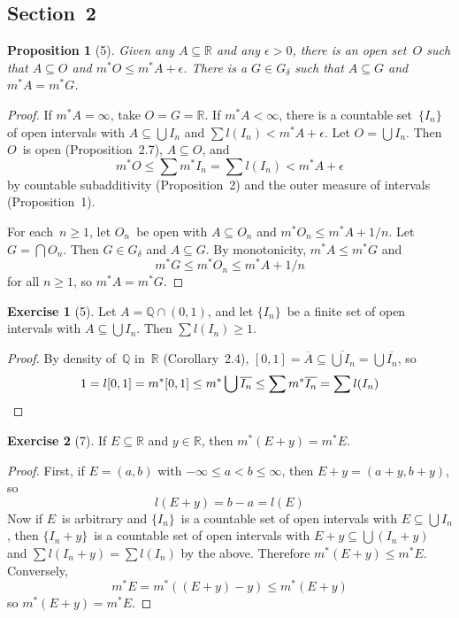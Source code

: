 \documentclass[letterpaper,12pt]{article}
\newcommand{\Q}{\mathbb{Q}}
\newcommand{\R}{\mathbb{R}}
\newcommand{\Gd}{G_{\delta}}
\newcommand{\sect}{\cap}
\newcommand{\bigunion}{\bigcup}
\newcommand{\bigsect}{\bigcap}
\newcommand{\len}{l}
\newcommand{\mo}{m^*}
\newcommand{\closure}[1]{\overline{#1}}
\theoremstyle{plain}
\newtheorem*{prop}{Proposition}
\theoremstyle{definition}
\newtheorem*{exer}{Exercise}
\theoremstyle{remark}
\begin{document}
\subsection*{Section~2}
\begin{prop}[5]
Given any \(A\subseteq\R\) and any \(\epsilon>0\), there is an open set~\(O\) such that \(A\subseteq O\) and \(\mo O\le\mo A+\epsilon\). There is a \(G\in\Gd\) such that \(A\subseteq G\) and \(\mo A=\mo G\).
\end{prop}
\begin{proof}
If \(\mo A=\infty\), take \(O=G=\R\). If \(\mo A<\infty\), there is a countable set~\(\{I_n\}\) of open intervals with \(A\subseteq\bigunion I_n\) and \(\sum\len(I_n)<\mo A+\epsilon\). Let \(O=\bigunion I_n\). Then \(O\)~is open (Proposition~2.7), \(A\subseteq O\), and
\[\mo O\le\sum\mo I_n=\sum\len(I_n)<\mo A+\epsilon\]
by countable subadditivity (Proposition~2) and the outer measure of intervals (Proposition~1).

For each~\(n\ge 1\), let \(O_n\)~be open with \(A\subseteq O_n\) and \(\mo O_n\le\mo A+1/n\). Let \(G=\bigsect O_n\). Then \(G\in\Gd\) and \(A\subseteq G\). By monotonicity, \(\mo A\le\mo G\) and
\[\mo G\le\mo O_n\le\mo A+1/n\]
for all \(n\ge 1\), so \(\mo A=\mo G\).
\end{proof}

\begin{exer}[5]
Let \(A=\Q\sect(0,1)\), and let \(\{I_n\}\)~be a finite set of open intervals with \(A\subseteq\bigunion I_n\). Then \(\sum\len(I_n)\ge 1\).
\end{exer}
\begin{proof}
By density of~\(\Q\) in~\(\R\) (Corollary~2.4), \([0,1]=\closure{A}\subseteq\closure{\bigunion I_n}=\bigunion\closure{I_n}\), so
\[1=\len[0,1]=\mo[0,1]\le\mo\bigunion\closure{I_n}\le\sum\mo\closure{I_n}=\sum\len(I_n)\qedhere\]
\end{proof}

\begin{exer}[7]
If \(E\subseteq\R\) and \(y\in\R\), then \(\mo(E+y)=\mo E\).
\end{exer}
\begin{proof}
First, if \(E=(a,b)\) with \(-\infty\le a<b\le\infty\), then \(E+y=(a+y,b+y)\), so
\[\len(E+y)=b-a=\len(E)\]
Now if \(E\)~is arbitrary and \(\{I_n\}\)~is a countable set of open intervals with \(E\subseteq\bigunion I_n\), then \(\{I_n+y\}\)~is a countable set of open intervals with \(E+y\subseteq\bigunion(I_n+y)\) and \(\sum\len(I_n+y)=\sum\len(I_n)\) by the above. Therefore \(\mo(E+y)\le\mo E\). Conversely,
\[\mo E=\mo((E+y)-y)\le\mo(E+y)\]
so \(\mo(E+y)=\mo E\).
\end{proof}
\end{document}
